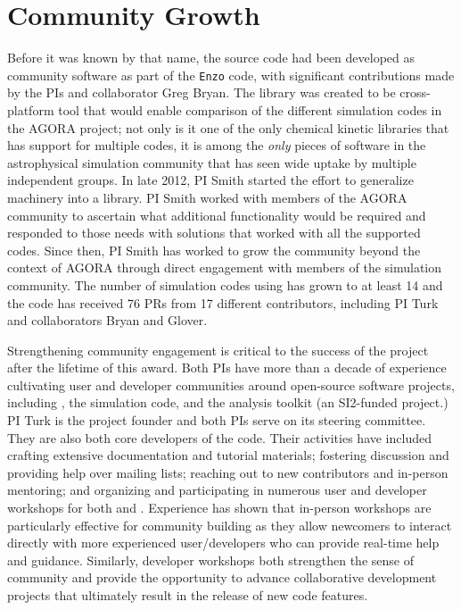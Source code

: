 \section{Community Growth}\label{sec:community_growth}

Before it was known by that name, the \grackle{} source code had
been developed as community software as part of the \texttt{Enzo}
code, with significant contributions made by the PIs and collaborator
Greg Bryan.  The \grackle{} library was created to be cross-platform
tool that would enable comparison of the
different simulation codes in the AGORA project; not only is it one of the only
chemical kinetic libraries that has support for multiple codes, it is among the
\textit{only} pieces of software in the astrophysical simulation community that
has seen wide uptake by multiple independent groups.  In late 2012, PI
Smith started the effort to generalize  machinery into a library.
PI Smith worked with members of
the AGORA community to ascertain what additional functionality would be
required and responded to those needs with solutions that worked with
all the supported codes.  Since then, PI Smith has worked to grow the
\grackle{} community beyond the context of AGORA through direct
engagement with members of the simulation community.  The number of
simulation codes using \grackle{} has grown to at least 14 and the
code has received 76 PRs from 17 different contributors, including PI
Turk and collaborators Bryan and Glover.

Strengthening community engagement is critical to the success of the
\grackle{} project after the lifetime of this award.  Both PIs
have more than a decade of experience cultivating user and developer
communities around open-source software projects, including
\grackle{}, the \enzo{} simulation code, and the \yt{} analysis
toolkit (an SI2-funded project.)  PI Turk is the \yt{} project founder
and both PIs serve on its steering committee.  They are also both core
developers of the \enzo{} code.  Their activities have included
crafting extensive documentation and tutorial materials; fostering
discussion and providing help over mailing lists; reaching out to new
contributors and in-person mentoring; and organizing and participating
in numerous user and developer workshops for both \enzo{} and \yt{}.
Experience has shown that in-person workshops are particularly
effective for community building as they allow newcomers to interact
directly with more experienced user/developers who can provide
real-time help and guidance.  Similarly, developer workshops both
strengthen the sense of community and provide the opportunity to
advance collaborative development projects that ultimately result in
the release of new code features.

